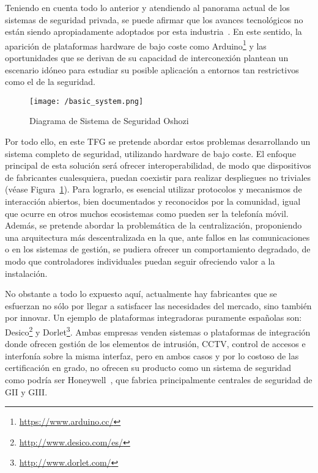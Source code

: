 Teniendo en cuenta todo lo anterior y atendiendo al panorama actual de los sistemas de seguridad privada, se puede afirmar que los avances tecnológicos no están siendo apropiadamente adoptados por esta industria~\cite{PPavan2015}. En este sentido, la aparición de plataformas hardware de bajo coste como Arduino\footnote{\url{https://www.arduino.cc/}} y las oportunidades que se derivan de su capacidad de interconexión plantean un escenario idóneo para estudiar su posible aplicación a entornos tan restrictivos como el de la seguridad.  

\begin{figure}[!h]
\centering
\texttt{[image: /basic\_system.png]}
\caption{Diagrama de Sistema de Seguridad Oshozi}
\label{fig:basic_system}
\end{figure}

Por todo ello,  en este \acf{TFG} se pretende  abordar estos problemas
desarrollando un sistema completo de seguridad, utilizando hardware de
bajo  coste.  El  enfoque  principal de  esta  solución  será  ofrecer
interoperabilidad,   de   modo   que   dispositivos   de   fabricantes
cualesquiera, puedan coexistir para  realizar despliegues no triviales
(véase  Figura~\ref{fig:basic_system}).  Para  lograrlo,  es  esencial
utilizar  protocolos  y  mecanismos   de  interacción  abiertos,  bien
documentados y reconocidos por la comunidad, igual que ocurre en otros
muchos  ecosistemas como  pueden ser  la telefonía  móvil. Además,  se
pretende abordar la problemática de la centralización, proponiendo una
arquitectura  más  descentralizada  en  la que,  ante  fallos  en  las
comunicaciones o  en los  sistemas de gestión,  se pudiera  ofrecer un
comportamiento  degradado,  de  modo  que  controladores  individuales
puedan seguir ofreciendo valor a la instalación.


No obstante a todo lo expuesto aquí, actualmente hay fabricantes que se esfuerzan no sólo por llegar a satisfacer las necesidades del mercado, sino también por innovar. Un ejemplo de plataformas integradoras puramente españolas son: Desico\footnote{\url{http://www.desico.com/es/}} y Dorlet\footnote{\url{http://www.dorlet.com/}}. Ambas empresas venden sistemas o plataformas de integración donde ofrecen gestión de los elementos de intrusión, CCTV, control de accesos e interfonía sobre la misma interfaz, pero en ambos casos y por lo costoso de las certificación en grado, no ofrecen su producto como un sistema de seguridad como podría ser Honeywell~\cite{Honeywell}, que fabrica principalmente centrales de seguridad de \acs{GII} y \acs{GIII}.


